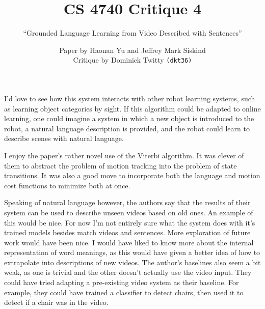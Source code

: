 \documentclass[12pt]{scrartcl}
\begin{document}
\title{CS 4740 Critique 4}
\subtitle{``Grounded Language Learning from Video Described with Sentences''}
\author{Paper by Haonan Yu and Jeffrey Mark Siskind \\
Critique by Dominick Twitty \texttt{(dkt36)}}
\date{}
\maketitle

I'd love to see how this system interacts with other robot learning systems, such as learning object categories by sight. If this algorithm could be adapted to online learning, one could imagine a system in which a new object is introduced to the robot, a natural language description is provided, and the robot could learn to describe scenes with natural language. 

I enjoy the paper's rather novel use of the Viterbi algorithm. It was clever of them to abstract the problem of motion tracking into the problem of state transitions. It was also a good move to incorporate both the language and motion cost functions to minimize both at once.

Speaking of natural language however, the authors say that the results of their system can be used to describe unseen videos based on old ones. An example of this would be nice. For now I'm not entirely sure what the system does with it's trained models besides match videos and sentences. More exploration of future work would have been nice. I would have liked to know more about the internal representation of word meanings, as this would have given a better idea of how to extrapolate into descriptions of new videos. The author's baselines also seem a bit weak, as one is trivial and the other doesn't actually use the video input. They could have tried adapting a pre-existing video system as their baseline. For example, they could have trained a classifier to detect chairs, then used  it to detect if a chair was in the video.
\end{document}
